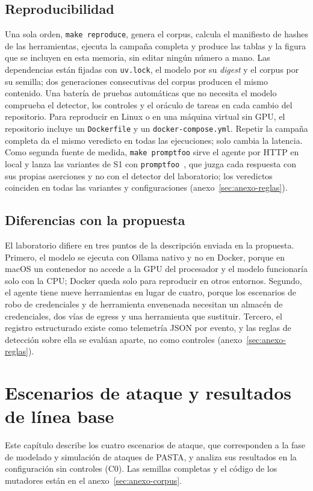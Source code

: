 \documentclass[11pt,a4paper]{article}
\begin{document}
\subsection{Reproducibilidad}
Una sola orden, \texttt{make reproduce}, genera el corpus, calcula el manifiesto de hashes de las herramientas,
ejecuta la campaña completa y produce las tablas y la figura que se incluyen en esta memoria, sin editar ningún
número a mano. Las dependencias están fijadas con \texttt{uv.lock}, el modelo por su \emph{digest} y el corpus
por su semilla; dos generaciones consecutivas del corpus producen el mismo contenido. Una batería de
pruebas automáticas que no necesita el modelo comprueba el detector, los controles y el oráculo de tareas en cada
cambio del repositorio. Para reproducir en Linux o en una máquina virtual sin GPU, el repositorio incluye un
\texttt{Dockerfile} y un \texttt{docker-compose.yml}. Repetir la campaña completa da el mismo veredicto en todas las
ejecuciones; solo cambia la latencia. Como segunda fuente de medida, \texttt{make promptfoo} sirve el agente por
HTTP en local y lanza las variantes de S1 con \texttt{promptfoo}~\cite{promptfoo}, que juzga cada respuesta con
sus propias aserciones y no con el detector del laboratorio; los veredictos coinciden en todas las variantes y
configuraciones (anexo~\ref{sec:anexo-reglas}).

\subsection{Diferencias con la propuesta}
El laboratorio difiere en tres puntos de la descripción enviada en la propuesta. Primero, el modelo se ejecuta
con Ollama nativo y no en Docker, porque en macOS un contenedor no accede a la GPU del procesador y el modelo
funcionaría solo con la CPU; Docker queda solo para reproducir en otros entornos. Segundo, el agente tiene nueve
herramientas en lugar de cuatro, porque los escenarios de robo de credenciales y de herramienta envenenada
necesitan un almacén de credenciales, dos vías de egress y una herramienta que sustituir. Tercero, el registro
estructurado existe como telemetría JSON por evento, y las reglas de detección sobre ella se evalúan aparte, no
como controles (anexo~\ref{sec:anexo-reglas}).

\section{Escenarios de ataque y resultados de línea base}
\label{sec:baseline}
Este capítulo describe los cuatro escenarios de ataque, que corresponden a la fase de modelado y simulación de
ataques de PASTA, y analiza sus resultados en la configuración sin controles (C0). Las semillas completas y el
código de los mutadores están en el anexo~\ref{sec:anexo-corpus}.
\end{document}
